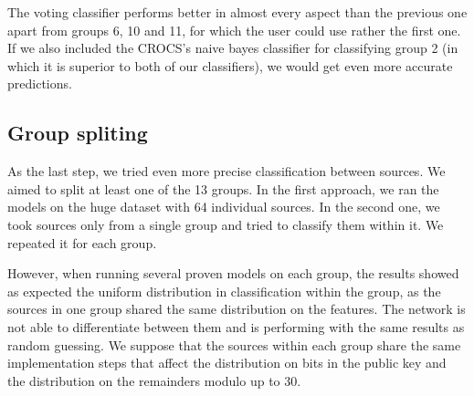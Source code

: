 The voting classifier performs better in almost every aspect than the previous one apart from groups 6, 10 and 11, for which the user could use rather the first one. If we also included the CROCS's naive bayes classifier for classifying group 2 (in which it is superior to both of our classifiers), we would get even more accurate predictions.

\subsection*{Group spliting}

As the last step, we tried even more precise classification between sources. We aimed to split at least one of the 13 groups. In the first approach, we ran the models on the huge dataset with 64 individual sources. In the second one, we took sources only from a single group and tried to classify them within it. We repeated it for each group.

However, when running several proven models on each group, the results showed as expected the uniform distribution in classification within the group, as the sources in one group shared the same distribution on the features. The network is not able to differentiate between them and is performing with the same results as random guessing. We suppose that the sources within each group share the same implementation steps that affect the distribution on bits in the public key and the distribution on the remainders modulo up to 30.

